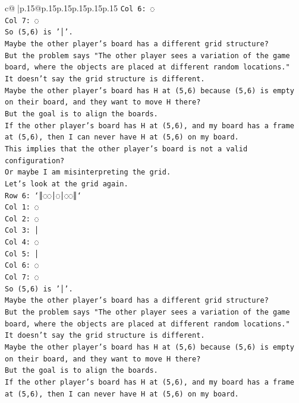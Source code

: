 \documentclass{article}
\begin{document}
{\begin{supertabular}{c@{$\;$}|p{.15\linewidth}@{}p{.15\linewidth}p{.15\linewidth}p{.15\linewidth}p{.15\linewidth}p{.15\linewidth}}
{{{\texttt{Col 6: ◌} \\
\texttt{Col 7: ◌} \\
\texttt{So (5,6) is '│'.} \\
\texttt{Maybe the other player's board has a different grid structure?} \\
\texttt{But the problem says "The other player sees a variation of the game board, where the objects are placed at different random locations."} \\
\texttt{It doesn't say the grid structure is different.} \\
\texttt{Maybe the other player's board has H at (5,6) because (5,6) is empty on their board, and they want to move H there?} \\
\texttt{But the goal is to align the boards.} \\
\texttt{If the other player's board has H at (5,6), and my board has a frame at (5,6), then I can never have H at (5,6) on my board.} \\
\texttt{This implies that the other player's board is not a valid configuration?} \\
\texttt{Or maybe I am misinterpreting the grid.} \\
\texttt{Let's look at the grid again.} \\
\texttt{Row 6: `║◌◌│◌│◌◌║`} \\
\texttt{Col 1: ◌} \\
\texttt{Col 2: ◌} \\
\texttt{Col 3: │} \\
\texttt{Col 4: ◌} \\
\texttt{Col 5: │} \\
\texttt{Col 6: ◌} \\
\texttt{Col 7: ◌} \\
\texttt{So (5,6) is '│'.} \\
\texttt{Maybe the other player's board has a different grid structure?} \\
\texttt{But the problem says "The other player sees a variation of the game board, where the objects are placed at different random locations."} \\
\texttt{It doesn't say the grid structure is different.} \\
\texttt{Maybe the other player's board has H at (5,6) because (5,6) is empty on their board, and they want to move H there?} \\
\texttt{But the goal is to align the boards.} \\
\texttt{If the other player's board has H at (5,6), and my board has a frame at (5,6), then I can never have H at (5,6) on my board.} \\
}}}
\end{supertabular}}
\end{document}
